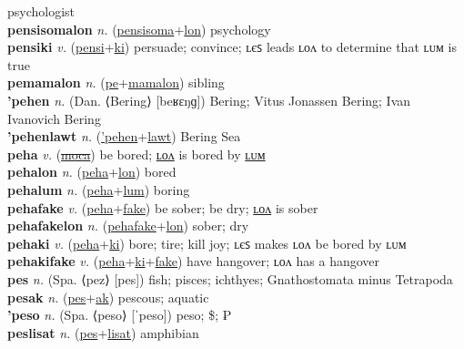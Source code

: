 psychologist \label{pensisomales} \\
\textbf{pensisomalon} \textit{n.} (\hyperref[pensisoma]{pensisoma}+\hyperref[lon]{lon})
psychology \label{pensisomalon} \\
\textbf{pensiki} \textit{v.} (\hyperref[pensi]{pensi}+\hyperref[ki]{ki})
persuade; convince; ʟєꜱ leads ʟᴏᴧ to determine that ʟᴜᴍ is true \label{pensiki} \\
\textbf{pemamalon} \textit{n.} (\hyperref[pe]{pe}+\hyperref[mamalon]{mamalon})
sibling \label{pemamalon} \\
\textbf{'pehen} \textit{n.} (Dan. ⟨Bering⟩ [beʁɛŋɡ])
Bering; Vitus Jonassen Bering; Ivan Ivanovich Bering \label{'pehen} \\
\textbf{'pehenlawt} \textit{n.} (\hyperref['pehen]{'pehen}+\hyperref[lawt]{lawt})
Bering Sea \label{'pehenlawt} \\
\textbf{peha} \textit{v.} (\hyperref[moca]{\sout{moca}})
be bored; \hyperref[pehalon]{ʟᴏᴧ} is bored by \hyperref[pehalum]{ʟᴜᴍ} \label{peha} \\
\textbf{pehalon} \textit{n.} (\hyperref[peha]{peha}+\hyperref[lon]{lon})
bored \label{pehalon} \\
\textbf{pehalum} \textit{n.} (\hyperref[peha]{peha}+\hyperref[lum]{lum})
boring \label{pehalum} \\
\textbf{pehafake} \textit{v.} (\hyperref[peha]{peha}+\hyperref[fake]{fake})
be sober; be dry; \hyperref[pehafakelon]{ʟᴏᴧ} is sober \label{pehafake} \\
\textbf{pehafakelon} \textit{n.} (\hyperref[pehafake]{pehafake}+\hyperref[lon]{lon})
sober; dry \label{pehafakelon} \\
\textbf{pehaki} \textit{v.} (\hyperref[peha]{peha}+\hyperref[ki]{ki})
bore; tire; kill joy; ʟєꜱ makes ʟᴏᴧ be bored by ʟᴜᴍ \label{pehaki} \\
\textbf{pehakifake} \textit{v.} (\hyperref[peha]{peha}+\hyperref[ki]{ki}+\hyperref[fake]{fake})
have hangover; ʟᴏᴧ has a hangover \label{pehakifake} \\
\textbf{pes} \textit{n.} (Spa. ⟨pez⟩ [pes])
fish; pisces; ichthyes; Gnathostomata minus Tetrapoda \label{pes} \\
\textbf{pesak} \textit{n.} (\hyperref[pes]{pes}+\hyperref[ak]{ak})
pescous; aquatic \label{pesak} \\
\textbf{'peso} \textit{n.} (Spa. ⟨peso⟩ [ˈpeso])
peso; \$; ₱ \label{'peso} \\
\textbf{peslisat} \textit{n.} (\hyperref[pes]{pes}+\hyperref[lisat]{lisat})
amphibian \label{peslisat} \\
